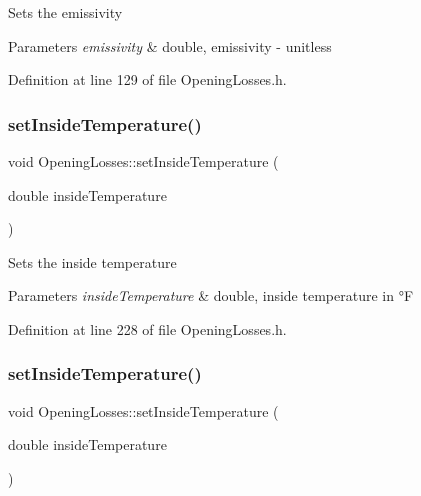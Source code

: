Sets the emissivity 
\begin{DoxyParams}{Parameters}
{\em emissivity} & double, emissivity -\/ unitless \\
\hline
\end{DoxyParams}


Definition at line 129 of file Opening\+Losses.\+h.

\mbox{\label{class_opening_losses_a895dcaa81bbb3dc823ec903480f05262}} 
\subsubsection{\texorpdfstring{set\+Inside\+Temperature()}{setInsideTemperature()}\hspace{0.1cm}{\footnotesize\ttfamily [1/3]}}
{\footnotesize\ttfamily void Opening\+Losses\+::set\+Inside\+Temperature (\begin{DoxyParamCaption}\item[{double}]{inside\+Temperature }\end{DoxyParamCaption})\hspace{0.3cm}{\ttfamily [inline]}}

Sets the inside temperature 
\begin{DoxyParams}{Parameters}
{\em inside\+Temperature} & double, inside temperature in °F \\
\hline
\end{DoxyParams}


Definition at line 228 of file Opening\+Losses.\+h.

\mbox{\label{class_opening_losses_a895dcaa81bbb3dc823ec903480f05262}} 
\subsubsection{\texorpdfstring{set\+Inside\+Temperature()}{setInsideTemperature()}\hspace{0.1cm}{\footnotesize\ttfamily [2/3]}}
{\footnotesize\ttfamily void Opening\+Losses\+::set\+Inside\+Temperature (\begin{DoxyParamCaption}\item[{double}]{inside\+Temperature }\end{DoxyParamCaption})\hspace{0.3cm}{\ttfamily [inline]}}

